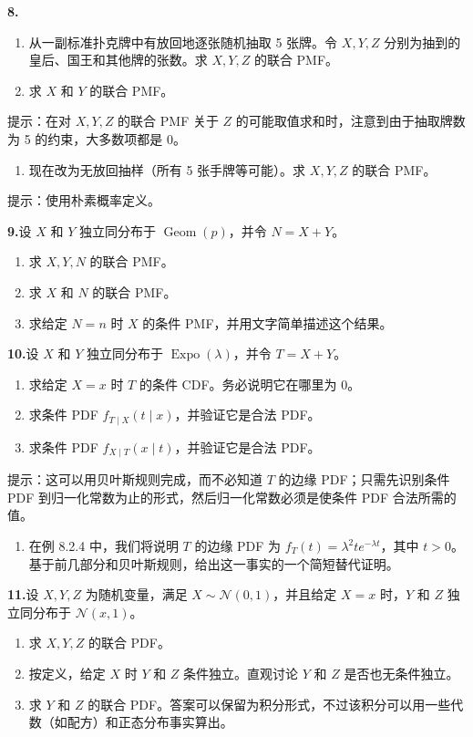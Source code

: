 \documentclass[UTF8, 12pt, fontset=fandol, oneside]{ctexart}
\begin{document}
\noindent\textbf{8.}\quad
\begin{enumerate}
  \item[(a)] 从一副标准扑克牌中有放回地逐张随机抽取 5 张牌。令 $X,Y,Z$ 分别为抽到的皇后、国王和其他牌的张数。求 $X,Y,Z$ 的联合 PMF。
  \item[(b)] 求 $X$ 和 $Y$ 的联合 PMF。
\end{enumerate}
提示：在对 $X,Y,Z$ 的联合 PMF 关于 $Z$ 的可能取值求和时，注意到由于抽取牌数为 5 的约束，大多数项都是 $0$。
\begin{enumerate}
  \item[(c)] 现在改为无放回抽样（所有 5 张手牌等可能）。求 $X,Y,Z$ 的联合 PMF。
\end{enumerate}
提示：使用朴素概率定义。

\noindent\textbf{9.}\quad 设 $X$ 和 $Y$ 独立同分布于 $\operatorname{Geom}(p)$，并令 $N=X+Y$。
\begin{enumerate}
  \item[(a)] 求 $X,Y,N$ 的联合 PMF。
  \item[(b)] 求 $X$ 和 $N$ 的联合 PMF。
  \item[(c)] 求给定 $N=n$ 时 $X$ 的条件 PMF，并用文字简单描述这个结果。
\end{enumerate}

\noindent\textbf{10.}\quad 设 $X$ 和 $Y$ 独立同分布于 $\operatorname{Expo}(\lambda)$，并令 $T=X+Y$。
\begin{enumerate}
  \item[(a)] 求给定 $X=x$ 时 $T$ 的条件 CDF。务必说明它在哪里为 $0$。
  \item[(b)] 求条件 PDF $f_{T\mid X}(t\mid x)$，并验证它是合法 PDF。
  \item[(c)] 求条件 PDF $f_{X\mid T}(x\mid t)$，并验证它是合法 PDF。
\end{enumerate}
提示：这可以用贝叶斯规则完成，而不必知道 $T$ 的边缘 PDF；只需先识别条件 PDF 到归一化常数为止的形式，然后归一化常数必须是使条件 PDF 合法所需的值。
\begin{enumerate}
  \item[(d)] 在例 8.2.4 中，我们将说明 $T$ 的边缘 PDF 为 $f_T(t)=\lambda^2te^{-\lambda t}$，其中 $t>0$。基于前几部分和贝叶斯规则，给出这一事实的一个简短替代证明。
\end{enumerate}

\noindent\textbf{11.}\quad 设 $X,Y,Z$ 为随机变量，满足 $X\sim \mathcal{N}(0,1)$，并且给定 $X=x$ 时，$Y$ 和 $Z$ 独立同分布于 $\mathcal{N}(x,1)$。
\begin{enumerate}
  \item[(a)] 求 $X,Y,Z$ 的联合 PDF。
  \item[(b)] 按定义，给定 $X$ 时 $Y$ 和 $Z$ 条件独立。直观讨论 $Y$ 和 $Z$ 是否也无条件独立。
  \item[(c)] 求 $Y$ 和 $Z$ 的联合 PDF。答案可以保留为积分形式，不过该积分可以用一些代数（如配方）和正态分布事实算出。
\end{enumerate}
\end{document}
